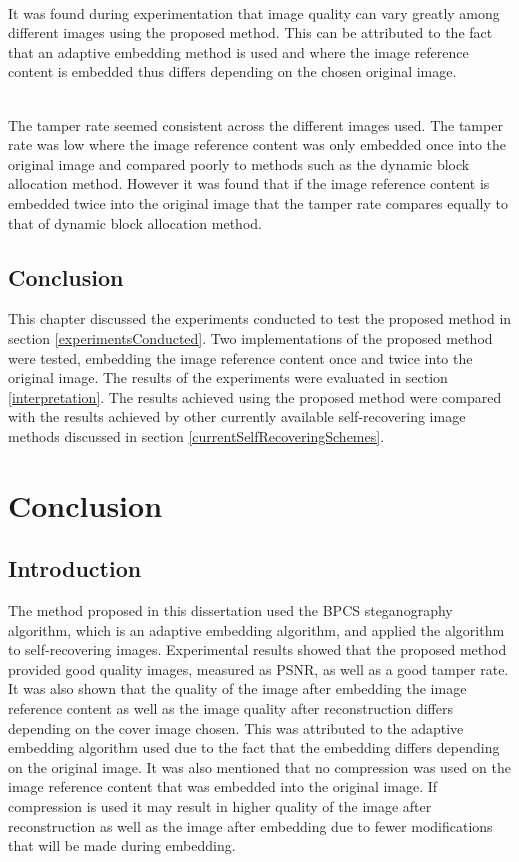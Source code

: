 \documentclass[12pt]{article}
\begin{document}
\hspace{0pt} \\
It was found during experimentation that image quality can vary greatly among different images using the proposed method.
This can be attributed to the fact that an adaptive embedding method is used and where the image reference content is embedded thus differs depending on the chosen original image.

\hspace{0pt} \\
The tamper rate seemed consistent across the different images used.
The tamper rate was low where the image reference content was only embedded once into the original image and compared poorly to methods such as the dynamic block allocation method.
However it was found that if the image reference content is embedded twice into the original image that the tamper rate compares equally to that of dynamic block allocation method.

\subsection{Conclusion}
This chapter discussed the experiments conducted to test the proposed method in section \ref{experimentsConducted}.
Two implementations of the proposed method were tested, embedding the image reference content once and twice into the original image.
The results of the experiments were evaluated in section \ref{interpretation}.
The results achieved using the proposed method were compared with the results achieved by other currently available self-recovering image methods discussed in section \ref{currentSelfRecoveringSchemes}.  

\section{Conclusion}
\subsection{Introduction}
The method proposed in this dissertation used the BPCS steganography algorithm, which is an adaptive embedding algorithm, and applied the algorithm to self-recovering images.
Experimental results showed that the proposed method provided good quality images, measured as PSNR, as well as a good tamper rate.
It was also shown that the quality of the image after embedding the image reference content as well as the image quality after reconstruction differs depending on the cover image chosen.
This was attributed to the adaptive embedding algorithm used due to the fact that the embedding differs depending on the original image.
It was also mentioned that no compression was used on the image reference content that was embedded into the original image.
If compression is used it may result in higher quality of the image after reconstruction as well as the image after embedding due to fewer modifications that will be made during embedding.
\end{document}
